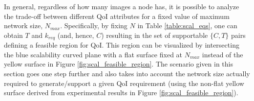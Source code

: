 In general, regardless of how many images a node has, it is possible to analyze the trade-off between different QoI attributes for a fixed value of maximum network size, $N_{max}$.  Specifically, by fixing $N$ in Table \ref{table:scal_eqs}, one can obtain $T$ and $k_{req}$ (and, hence, $C$) resulting in the set of supportable $\{C,T\}$ pairs defining a feasible region for QoI. This region can be visualized by intersecting the blue scalability curved plane with a flat surface fixed at $N_{max}$ instead of the yellow surface in Figure \ref{fig:scal_feasible_region}.  The scenario given in this section goes one step further and also takes into account  the network size actually required to generate/support a given QoI requirement (using the non-flat yellow surface derived from experimental results in Figure \ref{fig:scal_feasible_region}).
